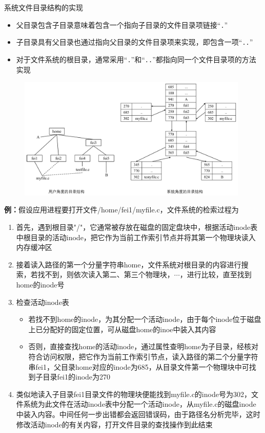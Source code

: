 \documentclass[cs4size,a4paper,10pt]{ctexart}
\begin{document}
	系统文件目录结构的实现
	\begin{itemize}
		\item 父目录包含子目录意味着包含一个指向子目录的文件目录项链接“\verb|.|”
		\item 子目录具有父目录也通过指向父目录的文件目录项来实现，即包含一项“\verb|..|”
		\item 对于文件系统的根目录，通常采用“\verb|.|”和“\verb|..|”都指向同一个文件目录项的方法实现
	\end{itemize}
	\begin{figure}[H]
		\centering
		\includegraphics[width=0.98\textwidth]{img/5.3.1.3.2}
	\end{figure}

	\textbf{例：}假设应用进程要打开文件/home/fei1/myfile.c，文件系统的检索过程为
	\begin{enumerate}[label=\arabic*.]
		\item 首先，遇到根目录"/"，它通常被存放在磁盘的固定盘块中，根据活动inode表中根目录的活动inode，把它作为当前工作索引节点并将其第一个物理块读入内存缓冲区
		\item 接着读入路径的第一个分量字符串home，文件系统对根目录的内容进行搜索，若找不到，则依次读入第二、第三个物理块，$\cdots$，进行比较，直至找到home的inode号
		\item 检查活动inode表
		\begin{itemize}
			\item 若找不到home的inode，为其分配一个活动inode，由于每个inode位于磁盘上已分配好的固定位置，可从磁盘home的inoe中装入其内容
			\item 否则，直接查找home的活动inode，通过属性查明home为子目录，经核对符合访问权限，把它作为当前工作索引节点，读入路径的第二个分量字符串fei1，父目录home对应的inode为685，从目录文件第一个物理块中可找到子目录fei1的inode为270
		\end{itemize}
		\item 类似地读入子目录fei1目录文件的物理块便能找到myfile.c的inode号为302，文件系统为此文件在活动inode表中分配一个活动inode，从myfile.c的磁盘inode中装入内容。中间任何一步出错都会返回错误码，由于路径名分析完毕，这时修改活动inode的有关内容，打开文件目录的查找操作到此结束
	\end{enumerate}
\end{document}
